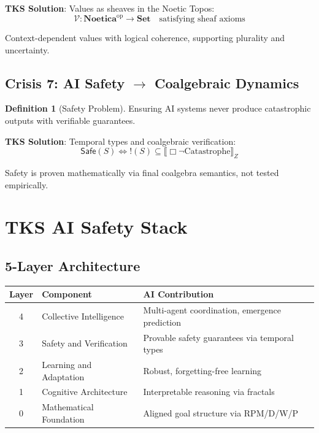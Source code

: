 \documentclass[11pt,twoside]{book}
\renewcommand{\arraystretch}{1.2}
\theoremstyle{definition}
\newtheorem{definition}{Definition}[chapter]
\theoremstyle{plain}
\theoremstyle{remark}
\newcommand{\sem}[1]{\llbracket #1 \rrbracket}
\newcommand{\Noetica}{\mathbf{Noetica}}
\begin{document}
\textbf{TKS Solution}: Values as sheaves in the Noetic Topos:
\begin{equation}
\boxed{
    \mathcal{V} : \Noetica^{\mathrm{op}} \to \mathbf{Set} \quad \text{satisfying sheaf axioms}
}
\end{equation}

Context-dependent values with logical coherence, supporting plurality and uncertainty.

\section{Crisis 7: AI Safety $\to$ Coalgebraic Dynamics}

\begin{definition}[Safety Problem]
Ensuring AI systems never produce catastrophic outputs with verifiable guarantees.
\end{definition}

\textbf{TKS Solution}: Temporal types and coalgebraic verification:
\begin{equation}
\boxed{
    \mathsf{Safe}(S) \iff !(S) \subseteq \sem{\Box \neg \mathrm{Catastrophe}}_Z
}
\end{equation}

Safety is proven mathematically via final coalgebra semantics, not tested empirically.

\chapter{TKS AI Safety Stack}
\label{ch:ai-safety-stack}

\section{5-Layer Architecture}

\begin{center}
\renewcommand{\arraystretch}{1.3}
\begin{tabularx}{\textwidth}{c|l|X}
\toprule
\textbf{Layer} & \textbf{Component} & \textbf{AI Contribution} \\
\midrule
4 & Collective Intelligence & Multi-agent coordination, emergence prediction \\
3 & Safety and Verification & Provable safety guarantees via temporal types \\
2 & Learning and Adaptation & Robust, forgetting-free learning \\
1 & Cognitive Architecture & Interpretable reasoning via fractals \\
0 & Mathematical Foundation & Aligned goal structure via RPM/D/W/P \\
\bottomrule
\end{tabularx}
\end{center}
\end{document}
